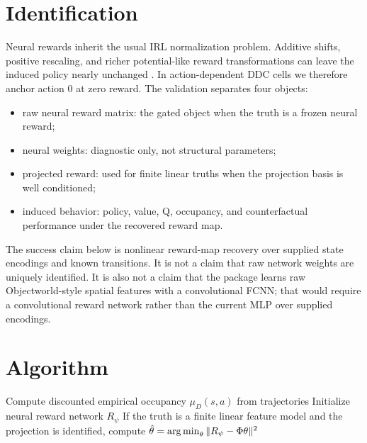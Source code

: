 \documentclass[10pt]{article}
\begin{document}
\section{Identification}

Neural rewards inherit the usual IRL normalization problem. Additive shifts,
positive rescaling, and richer potential-like reward transformations can leave
the induced policy nearly unchanged \citep{ng1999,kim2021}. In action-dependent
DDC cells we therefore anchor action 0 at zero reward. The validation separates
four objects:

\begin{itemize}
  \item raw neural reward matrix: the gated object when the truth is a frozen
  neural reward;
  \item neural weights: diagnostic only, not structural parameters;
  \item projected reward: used for finite linear truths when the projection
  basis is well conditioned;
  \item induced behavior: policy, value, Q, occupancy, and counterfactual
  performance under the recovered reward map.
\end{itemize}

The success claim below is nonlinear reward-map recovery over supplied state
encodings and known transitions. It is not a claim that raw network weights are
uniquely identified. It is also not a claim that the package learns raw
Objectworld-style spatial features with a convolutional FCNN; that would require
a convolutional reward network rather than the current MLP over supplied
encodings.

\section{Algorithm}

\begin{algorithm}[H]
\DontPrintSemicolon
\caption{Deep MCE-IRL with Anchored Reward-Map Validation}
Compute discounted empirical occupancy $\mu_D(s,a)$ from trajectories\;
Initialize neural reward network $R_\psi$\;
If the truth is a finite linear feature model and the projection is identified,
compute $\hat\theta=\operatorname*{arg\,min}_\theta\|R_\psi-\Phi\theta\|^2$\;
\end{algorithm}
\end{document}
